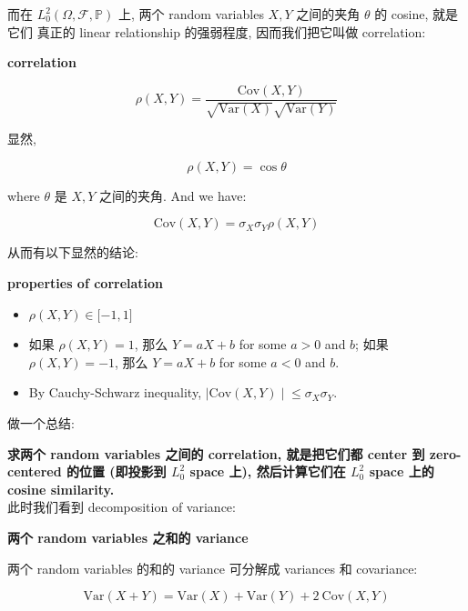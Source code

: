 \documentclass{qlnotes-export}
\begin{document}
而在 \(L_{0}^{2}(\Omega,\mathcal{F},{\mathbb{P}})\) 上, 两个 random variables \(X,Y\) 之间的夹角 \(\theta\) 的 cosine, 就是它们 真正的 linear relationship 的强弱程度, 因而我们把它叫做 correlation:

\begin{definition}{\protect{}\label{kn-correlation}{\textbf{correlation}}}

\[\rho(X,Y) = \frac{\text{Cov}(X,Y)}{\sqrt{\text{Var}(X)}\sqrt{\text{Var}(Y)}}\]

\end{definition}

显然,

\[\rho(X,Y) = \cos\theta\]

where \(\theta\) 是 \(X,Y\) 之间的夹角. And we have:

\[\text{Cov}(X,Y) = \sigma_{X}\sigma_{Y}\rho(X,Y)\]

从而有以下显然的结论:

\begin{proposition}{\protect{}\label{kn-properties-of-correlation}{\textbf{properties
of correlation}}}

\begin{itemize}
\item
  \(\rho(X,Y) \in \lbrack - 1,1\rbrack\)
\item
  如果 \(\rho(X,Y) = 1\), 那么 \(Y = aX + b\) for some \(a > 0\) and \(b\); 如果 \(\rho(X,Y) = - 1\), 那么 \(Y = aX + b\) for some \(a < 0\) and \(b\).~
\item
  By Cauchy-Schwarz inequality, \(\left. |\text{Cov}(X,Y) \middle| \leq \sigma_{X}\sigma_{Y} \right.\).
\end{itemize}

\end{proposition}

做一个总结:

\begin{center}

\end{center}

\textbf{求两个 random variables 之间的 correlation, 就是把它们都 center 到 zero-centered 的位置 (即投影到 \(L_{0}^{2}\) space 上), 然后计算它们在 \(L_{0}^{2}\) space 上的 cosine similarity.}\\
此时我们看到 decomposition of variance:

\begin{proposition}{\protect{}\label{kn-random-variables-variance}{\textbf{两个
random variables 之和的 variance}}}

两个 random variables 的和的 variance 可分解成 variances 和 covariance:

\[\text{Var}(X + Y) = \text{Var}(X) + \text{Var}(Y) + 2\ \text{Cov}(X,Y)\]

\end{proposition}
\end{document}
